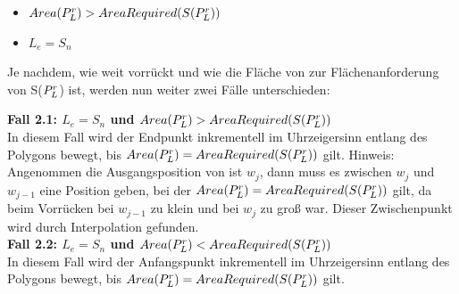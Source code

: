 \documentclass[ngerman]{seminarbeitrag}
\begin{document}
\begin{itemize}
\item $Area(P_{L}^{r})>AreaRequired(S(P_{L}^{r}))$
\item $L_{e} = S_{n}$
\end{itemize}

Je nachdem, wie weit \Le vorrückt und wie die Fläche von \prl zur Flächenanforderung von S($P_{L}^{r}$) ist, werden nun weiter zwei Fälle unterschieden:

\textbf{Fall 2.1: $L_{e} = S_{n}$ und $Area(P_{L}^{r})>AreaRequired(S(P_{L}^{r}))$} \\
In diesem Fall wird der Endpunkt \Le inkrementell im Uhrzeigersinn entlang des Polygons bewegt, bis $Area(P_{L}^{r})=AreaRequired(S(P_{L}^{r}))$ gilt.
Hinweis: Angenommen die Ausgangsposition von \Le ist $w_{j}$, dann muss es zwischen $w_{j}$ und $w_{j-1}$ eine Position geben, bei der $Area(P_{L}^{r})=AreaRequired(S(P_{L}^{r}))$ gilt, da beim Vorrücken \ar{\mprl} bei $w_{j-1}$ zu klein und bei $w_{j}$ zu groß war. Dieser Zwischenpunkt wird durch Interpolation gefunden.\\

\textbf{Fall 2.2: $L_{e} = S_{n}$ und $Area(P_{L}^{r})<AreaRequired(S(P_{L}^{r}))$} \\
In diesem Fall wird der Anfangspunkt \ls inkrementell im Uhrzeigersinn entlang des Polygons bewegt, bis $Area(P_{L}^{r})=AreaRequired(S(P_{L}^{r}))$ gilt.
\end{document}
